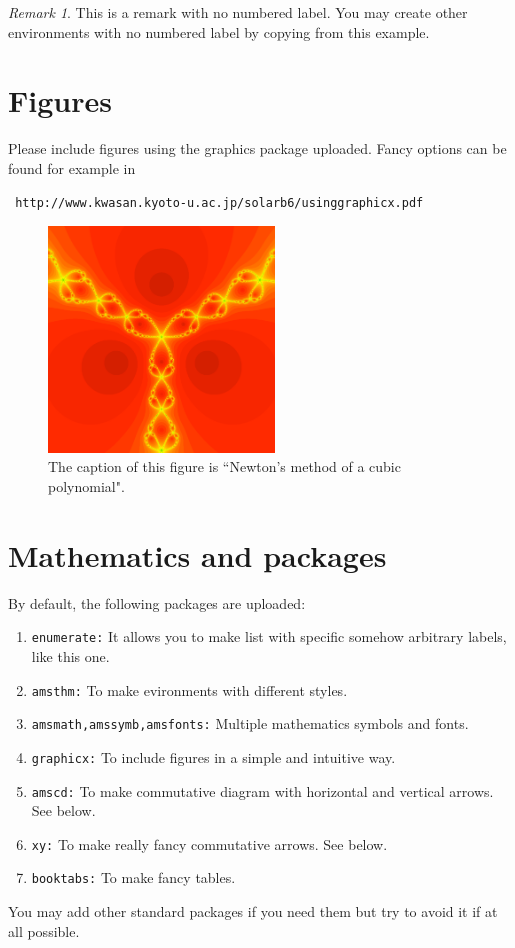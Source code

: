 \documentclass[12,twoside]{TFG-GM}
\theoremstyle{definition}
\theoremstyle{remark}
\newtheorem*{remarknonumber}{Remark}
\begin{document}
\begin{remarknonumber}
This is a remark with no numbered label. You may create other environments with no numbered label by copying from this example.
\end{remarknonumber}

\section{Figures}

Please include figures using the graphics package uploaded.  Fancy options can be found for example in  \begin{verbatim} http://www.kwasan.kyoto-u.ac.jp/solarb6/usinggraphicx.pdf \end{verbatim}

\begin{figure}[htb!]
\begin{center}
\includegraphics[width=6cm]{samplefigure.pdf}
\end{center}
\caption{\label{sample figure} \small The caption of this figure is ``Newton's method of a cubic polynomial".}
\end{figure}

\section{Mathematics and packages} \label{packages}

By default, the following packages are uploaded:
\begin{enumerate}[\bf (1)]
\item {\tt enumerate:} It allows you to make list with specific somehow arbitrary labels, like this one.
\item {\tt amsthm:} To make evironments with different styles.
\item {\tt amsmath,amssymb,amsfonts:} Multiple mathematics symbols and fonts.
\item {\tt graphicx:} To include figures in a simple and intuitive way.
\item {\tt amscd:} To make commutative diagram with horizontal and vertical arrows. See below.
\item {\tt xy:} To make really fancy commutative arrows. See below.
\item {\tt booktabs:} To make fancy tables.
\end{enumerate}
You may add other standard packages if you need them but try to avoid it if at all possible.
\end{document}
